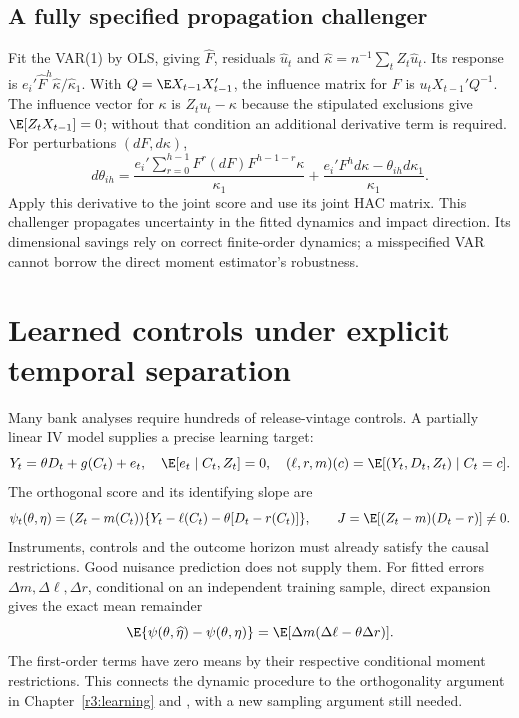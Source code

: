 \subsection{A fully specified propagation challenger}
Fit the VAR(1) by OLS, giving $\widehat F$, residuals $\widehat u_t$ and
$\widehat\kappa=n^{-1}\sum_tZ_t\widehat u_t$. Its response is
$e_i'\widehat F^h\widehat\kappa/\widehat\kappa_1$.
With $Q=\E X_{t-1}X_{t-1}'$, the influence matrix for $F$ is
$u_tX_{t-1}'Q^{-1}$. The influence vector for $\kappa$ is
$Z_tu_t-\kappa$ because the stipulated exclusions give
$\E[Z_tX_{t-1}]=0$; without that condition an additional derivative term
is required. For perturbations $(dF,d\kappa)$,
\[
 d\theta_{ih}=\frac{e_i'\sum_{r=0}^{h-1}F^r(dF)F^{h-1-r}\kappa}
                       {\kappa_1}
 +\frac{e_i'F^hd\kappa-\theta_{ih}d\kappa_1}{\kappa_1}.
\]
Apply this derivative to the joint score and use its joint HAC matrix.
This challenger propagates uncertainty in the fitted dynamics and impact
direction. Its dimensional savings rely on correct finite-order dynamics;
a misspecified VAR cannot borrow the direct moment estimator's robustness.

\section{Learned controls under explicit temporal separation}
\label{s4:dependent-learning}
Many bank analyses require hundreds of release-vintage controls. A
partially linear IV model supplies a precise learning target:
\[
 Y_t=\theta D_t+g(C_t)+e_t,\quad
 \E[e_t\mid C_t,Z_t]=0,\quad
 (\ell,r,m)(c)=\E[(Y_t,D_t,Z_t)\mid C_t=c].
\]
The orthogonal score and its identifying slope are
\[
 \psi_t(\theta,\eta)=(Z_t-m(C_t))
  \{Y_t-\ell(C_t)-\theta[D_t-r(C_t)]\},\qquad
 J=\E[(Z_t-m)(D_t-r)]\ne0.
\]
Instruments, controls and the outcome horizon must already satisfy the
causal restrictions. Good nuisance prediction does not supply them.
For fitted errors $\Delta m,\Delta\ell,\Delta r$, conditional on an
independent training sample, direct expansion gives the exact mean remainder
\begin{equation}
 \E\{\psi(\theta,\widehat\eta)-\psi(\theta,\eta)\}
 =\E[\Delta m(\Delta\ell-\theta\Delta r)].
 \label{s4:dependent-remainder}
\end{equation}
The first-order terms have zero means by their respective conditional
moment restrictions. This connects the dynamic procedure to the
orthogonality argument in Chapter~\ref{r3:learning} and
\citet{dml2018}, with a new sampling argument still needed.

